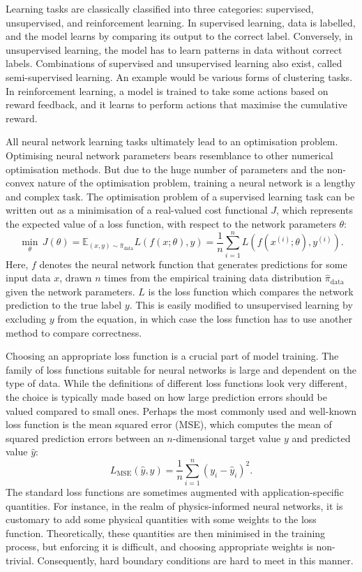 Learning tasks are classically classified into three categories: supervised, unsupervised, and reinforcement learning.
In supervised learning, data is labelled, and the model learns by comparing its output to the correct label.
Conversely, in unsupervised learning, the model has to learn patterns in data without correct labels.
Combinations of supervised and unsupervised learning also exist, called semi-supervised learning.
An example would be various forms of clustering tasks.
In reinforcement learning, a model is trained to take some actions based on reward feedback, and it learns to perform actions that maximise the cumulative reward. 

All neural network learning tasks ultimately lead to an optimisation problem.
Optimising neural network parameters bears resemblance to other numerical optimisation methods.
But due to the huge number of parameters and the non-convex nature of the optimisation problem, training a neural network is a lengthy and complex task.
The optimisation problem of a supervised learning task can be written out as a minimisation of a real-valued cost functional $J$, which represents the expected value of a loss function, with respect to the network parameters $\theta$:
\begin{equation*}
    \min_{\theta} \, J(\theta) = \mathbb{E}_{(x,y) \sim \hat{\pi}_{\text{data}}} L(f(x; \theta), y) = \frac{1}{n} \sum_{i=1}^{n}  L(f(x^{(i)}; \theta), y^{(i)}).
\end{equation*}
Here, $f$ denotes the neural network function that generates predictions for some input data $x$, drawn $n$ times from the empirical training data distribution $\hat{\pi}_{\text{data}}$ given the network parameters.
$L$ is the loss function which compares the network prediction to the true label $y$.
This is easily modified to unsupervised learning by excluding $y$ from the equation, in which case the loss function has to use another method to compare correctness.

Choosing an appropriate loss function is a crucial part of model training.
The family of loss functions suitable for neural networks is large and dependent on the type of data.
While the definitions of different loss functions look very different, the choice is typically made based on how large prediction errors should be valued compared to small ones.
Perhaps the most commonly used and well-known loss function is the mean squared error (MSE), which computes the mean of squared prediction errors between an $n$-dimensional target value $y$ and predicted value $\hat{y}$:
\begin{equation*}
    L_{\operatorname{MSE}}(\hat{y}, y) = \frac{1}{n} \sum_{i=1}^{n} \left( y_{i} - \hat{y}_{i} \right)^{2}.
\end{equation*}
The standard loss functions are sometimes augmented with application-specific quantities.
For instance, in the realm of physics-informed neural networks, it is customary to add some physical quantities with some weights to the loss function.
Theoretically, these quantities are then minimised in the training process, but enforcing it is difficult, and choosing appropriate weights is non-trivial.
Consequently, hard boundary conditions are hard to meet in this manner.


